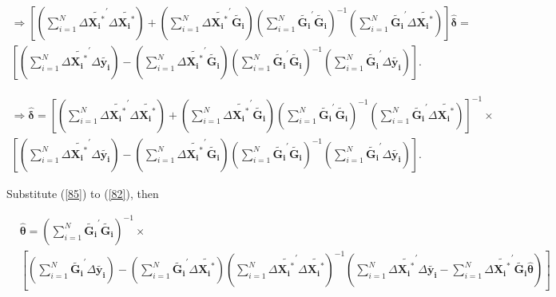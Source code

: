 \documentclass[12pt,a4paper,hyperref]{article}
\begin{document}
\begin{equation}
\begin{split}
\Rightarrow
[(\sum_{i=1}^{N} \Delta \tilde{\boldsymbol{X_{i}}^{\ast}}^{'} \Delta \tilde{\boldsymbol{X_{i}}^{\ast}})+(\sum_{i=1}^{N} \Delta \tilde{\boldsymbol{X_{i}}^{\ast}}^{'} \tilde{\boldsymbol{G_{i}}})(\sum_{i=1}^{N} \tilde{\boldsymbol{G_{i}}}^{'} \tilde{\boldsymbol{G_{i}}})^{-1} (\sum_{i=1}^{N} \tilde{\boldsymbol{G_{i}}}^{'} \Delta \tilde{\boldsymbol{X_{i}}^{\ast}})] \hat{\boldsymbol{\delta}}= \\
[(\sum_{i=1}^{N} \Delta \tilde{\boldsymbol{X_{i}}^{\ast}}^{'} \Delta \tilde{\boldsymbol{y_{i}}})-(\sum_{i=1}^{N} \Delta \tilde{\boldsymbol{X_{i}}^{\ast}}^{'} \tilde{\boldsymbol{G_{i}}}) (\sum_{i=1}^{N} \tilde{\boldsymbol{G_{i}}}^{'} \tilde{\boldsymbol{G_{i}}})^{-1}(\sum_{i=1}^{N} \tilde{\boldsymbol{G_{i}}}^{'} \Delta \tilde{\boldsymbol{y_{i}}})].
\end{split}
\end{equation}


\begin{equation}
\begin{split}
\Rightarrow
\hat{\boldsymbol{\delta}}= [(\sum_{i=1}^{N} \Delta \tilde{\boldsymbol{X_{i}}^{\ast}}^{'} \Delta \tilde{\boldsymbol{X_{i}}^{\ast}})+(\sum_{i=1}^{N} \Delta \tilde{\boldsymbol{X_{i}}^{\ast}}^{'} \tilde{\boldsymbol{G_{i}}})(\sum_{i=1}^{N} \tilde{\boldsymbol{G_{i}}}^{'} \tilde{\boldsymbol{G_{i}}})^{-1} (\sum_{i=1}^{N} \tilde{\boldsymbol{G_{i}}}^{'} \Delta \tilde{\boldsymbol{X_{i}}^{\ast}})]^{-1}\times \\
[(\sum_{i=1}^{N} \Delta \tilde{\boldsymbol{X_{i}}^{\ast }}^{'} \Delta \tilde{\boldsymbol{y_{i}}})-(\sum_{i=1}^{N} \Delta \tilde{\boldsymbol{X_{i}}^{\ast}}^{'} \tilde{\boldsymbol{G_{i}}}) (\sum_{i=1}^{N} \tilde{\boldsymbol{G_{i}}}^{'} \tilde{\boldsymbol{G_{i}}})^{-1}(\sum_{i=1}^{N} \tilde{\boldsymbol{G_{i}}}^{'} \Delta \tilde{\boldsymbol{y_{i}}})].
\end{split}
\end{equation}



Substitute (\ref{85}) to (\ref{82}), then

\begin{equation}
\begin{split}
&\hat{\boldsymbol{\theta}}=
(\sum_{i=1}^{N} \tilde{\boldsymbol{G_{i}}}^{'} \tilde{\boldsymbol{G_{i}}})^{-1} \times \\
&[(\sum_{i=1}^{N} \tilde{\boldsymbol{G_{i}}}^{'} \Delta \tilde{\boldsymbol{y_{i}}})-  (\sum_{i=1}^{N} \tilde{\boldsymbol{G_{i}}}^{'} \Delta \tilde{\boldsymbol{X_{i}}^{\ast}}) (\sum_{i=1}^{N} \Delta \tilde{\boldsymbol{X_{i}}^{\ast}}^{'} \Delta \tilde{\boldsymbol{X_{i}}^{\ast}})^{-1}
 (\sum_{i=1}^{N} \Delta \tilde{\boldsymbol{X_{i}}^{\ast }}^{'} \Delta \tilde{\boldsymbol{y_{i}}} - \sum_{i=1}^{N} \Delta \tilde{\boldsymbol{X_{i}}^{\ast}}^{'} \tilde{\boldsymbol{G_{i}}} \hat{\boldsymbol{\theta}})]
\end{split}
\end{equation}
\end{document}

